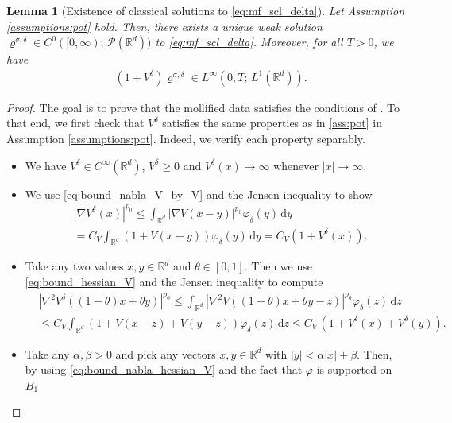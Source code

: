 \documentclass[reqno, 11pt]{amsart}
\numberwithin{equation}{section}
\newtheorem{lem}[thm]{Lemma}
\theoremstyle{definition}
\begin{document}
\begin{lem}[{Existence of classical solutions to \eqref{eq:mf_scl_delta}}]
    \label{lem:ex_cls_sol_mf_scl_del}
    Let Assumption \ref{assumptions:pot} hold. Then, there exists a unique weak solution $\varrho^{\sigma,\delta}\in C^0([0,\infty);\,\mathscr{P}(\mathbb{R}^{d}))$ to \eqref{eq:mf_scl_delta}. Moreover, for all $T>0$, we have
    \begin{align*}
        &(1+V^\delta)\varrho^{\sigma,\delta}\in L^\infty(0,T;\,L^1(\mathbb{R}^{d})).
    \end{align*}
\end{lem}
\begin{proof}
    The goal is to prove that the mollified data satisfies the conditions of \cite[Theorem 2.4]{lu_lu_nolen_2019_scaling}. To that end, we first check that $V^\delta$ satisfies the same properties as in \ref{ass:pot} in Assumption \ref{assumptions:pot}. Indeed, we verify each property separably.
    \begin{itemize}
        \item We have $V^\delta\in C^\infty(\mathbb{R}^{d})$, $V^\delta\geq 0$ and $V^\delta(x)\rightarrow \infty$ whenever $|x|\rightarrow \infty$.
        \item We use \eqref{eq:bound_nabla_V_by_V} and the Jensen inequality to show
        \begin{align*}
            &|\nabla V^\delta(x)|^{p_0}
            \leq\int_{\mathbb{R}^{d}} |\nabla V(x-y)|^{p_0} \varphi_\delta(y)\,\mathrm{d} y \\
            &=C_V\int_{\mathbb{R}^{d}} (1+V(x-y)) \varphi_\delta(y)\,\mathrm{d} y
            =C_V(1+V^\delta(x)).
        \end{align*}
        \item Take any two values $x,y\in \mathbb{R}^{d}$ and $\theta\in [0,1]$. Then we use \eqref{eq:bound_hessian_V} and the Jensen inequality to compute
        \begin{align*}
            &|\nabla^2 V^\delta((1-\theta) x+\theta y)|^{p_0}
            \leq \int_{\mathbb{R}^{d}} |\nabla^2 V((1-\theta) x+\theta y-z)|^{p_0} \varphi_\delta(z)\,\mathrm{d} z\\
            &\leq C_V\int_{\mathbb{R}^{d}} (1+V(x-z)+V(y-z)) \varphi_\delta(z)\,\mathrm{d} z
            \leq C_V\,(1+V^\delta(x)+V^\delta(y)).
        \end{align*}
        \item Take any $\alpha,\beta>0$ and pick any vectors $x,y\in\mathbb{R}^{d}$ with $|y| <\alpha|x|+\beta$. Then, by using \eqref{eq:bound_nabla_hessian_V} and the fact that $\varphi$ is supported on $B_1$

\end{itemize}
\end{proof}
\end{document}

